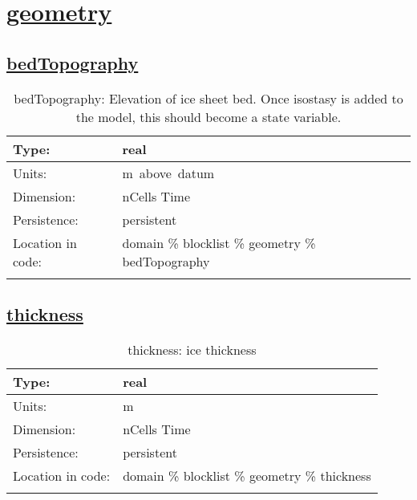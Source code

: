 \section[geometry]{\hyperref[sec:var_tab_geometry]{geometry}}
\label{sec:var_sec_geometry}
\subsection[bedTopography]{\hyperref[sec:var_tab_geometry]{bedTopography}}
\label{subsec:var_sec_geometry_bedTopography}
\begin{center}
\begin{longtable}{| p{2.0in} | p{4.0in} |}
        \hline 
        Type: & real \\
        \hline 
        Units: & \si{m.above.datum} \\
        \hline 
        Dimension: & nCells Time \\
        \hline 
        Persistence: & persistent \\
        \hline 
         Location in code: & domain \% blocklist \% geometry \% bedTopography \\
         \hline 
    \caption{bedTopography: Elevation of ice sheet bed.  Once isostasy is added to the model, this should become a state variable.}
\end{longtable}
\end{center}
\subsection[thickness]{\hyperref[sec:var_tab_geometry]{thickness}}
\label{subsec:var_sec_geometry_thickness}
\begin{center}
\begin{longtable}{| p{2.0in} | p{4.0in} |}
        \hline 
        Type: & real \\
        \hline 
        Units: & \si{m} \\
        \hline 
        Dimension: & nCells Time \\
        \hline 
        Persistence: & persistent \\
        \hline 
         Location in code: & domain \% blocklist \% geometry \% thickness \\
         \hline 
    \caption{thickness: ice thickness}
\end{longtable}
\end{center}
